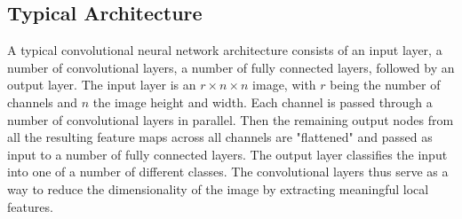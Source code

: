 \subsection{Typical Architecture}

\noindent A typical convolutional neural network architecture consists of an input layer, a number of convolutional layers, a number of fully connected layers, followed by an output layer. The input layer is an $r \times n \times n$ image, with $r$ being the number of channels and $n$ the image height and width. Each channel is passed through a number of convolutional layers in parallel. Then the remaining output nodes from all the resulting feature maps across all channels are "flattened" and passed as input to a number of fully connected layers. The output layer classifies the input into one of a number of different classes. The convolutional layers thus serve as a way to reduce the dimensionality of the image by extracting meaningful local features.








